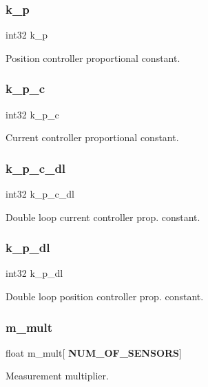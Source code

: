 \subsubsection{k\+\_\+p}
{\footnotesize\ttfamily int32 k\+\_\+p}

Position controller proportional constant. \mbox{\label{structst__mem_ac3311db4a733f35aa5ed2672cb162f96}} 
\subsubsection{k\+\_\+p\+\_\+c}
{\footnotesize\ttfamily int32 k\+\_\+p\+\_\+c}

Current controller proportional constant. \mbox{\label{structst__mem_a63c3f3c01d6757cafdb40043adce404e}} 
\subsubsection{k\+\_\+p\+\_\+c\+\_\+dl}
{\footnotesize\ttfamily int32 k\+\_\+p\+\_\+c\+\_\+dl}

Double loop current controller prop. constant. \mbox{\label{structst__mem_a047226f308f4365d9d0036d71b6ed910}} 
\subsubsection{k\+\_\+p\+\_\+dl}
{\footnotesize\ttfamily int32 k\+\_\+p\+\_\+dl}

Double loop position controller prop. constant. \mbox{\label{structst__mem_aecf0baab567443534c0ded663b746896}} 
\subsubsection{m\+\_\+mult}
{\footnotesize\ttfamily float m\+\_\+mult[\textbf{ N\+U\+M\+\_\+\+O\+F\+\_\+\+S\+E\+N\+S\+O\+RS}]}

Measurement multiplier. \mbox{\label{structst__mem_ab544f035124be893918bafb611fe88d9}} 
